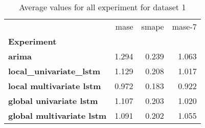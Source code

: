 \begin{table}[h]
\centering
\caption{Average values for all experiment for dataset 1}
\label{table:Average-metric-dataset-1}
\begin{tabular}{lrrr}
\toprule
{} &   mase &  smape &  mase-7 \\
\textbf{Experiment              } &        &        &         \\
\midrule
\textbf{arima                   } &  1.294 &  0.239 &   1.063 \\
\textbf{local\_univariate\_lstm   } &  1.129 &  0.208 &   1.017 \\
\textbf{local multivariate lstm } &  0.972 &  0.183 &   0.922 \\
\textbf{global univariate lstm  } &  1.107 &  0.203 &   1.020 \\
\textbf{global multivariate lstm} &  1.091 &  0.202 &   1.055 \\
\bottomrule
\end{tabular}
\end{table}
